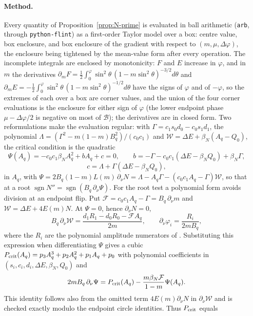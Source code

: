 \documentclass[11pt]{article}
\theoremstyle{remark}
\begin{document}
\paragraph{Method.}  Every quantity of Proposition~\ref{prop:N-prime} is
evaluated in ball arithmetic \cite{Johansson2017Arb,Tucker2011}
(\texttt{arb}, through \texttt{python-flint}) as a first-order Taylor
model over a box: centre value, box enclosure, and box enclosure of the
gradient with respect to $(m,\mu,\Delta\varphi)$, the enclosure being
tightened by the mean-value form after every operation.  The incomplete
integrals are enclosed by monotonicity: $F$ and $E$ increase in
$\varphi$, and in $m$ the derivatives
$\partial_mF=\tfrac12\int_0^\varphi\sin^2\theta\,(1-m\sin^2\theta)^{-3/2}d\theta$
and
$\partial_mE=-\tfrac12\int_0^\varphi\sin^2\theta\,(1-m\sin^2\theta)^{-1/2}d\theta$
have the signs of $\varphi$ and of $-\varphi$, so the extremes of each
over a box are corner values, and the union of the four corner
evaluations is the enclosure for either sign of $\varphi$ (the lower
endpoint phase $\mu-\Delta\varphi/2$ is negative on most of
$\mathcal B$); the derivatives are in closed form.  Two reformulations make the evaluation regular: with
$\Gamma=c_1s_0d_0-c_0s_1d_1$, the polynomial
$\Lambda=(\Gamma^2-m(1-m)B_q^2)/(c_0c_1)$ and $\mathcal W=\Delta E+\beta_N(A_q-Q_0)$,
the critical condition is the quadratic
\[
 \Psi(A_q)=-c_0c_1\beta_NA_q^2+bA_q+c=0,\qquad
 b=-\Gamma-c_0c_1(\Delta E-\beta_NQ_0)+\beta_N\Gamma,
\]
\[
 c=\Lambda+\Gamma(\Delta E-\beta_NQ_0),
\]
in $A_q$, with $\Psi=2B_q(1-m)L(m)\,\partial_\nu N=\Lambda-A_q\Gamma-(c_0c_1A_q-\Gamma)\mathcal W$,
so that at a root $\operatorname{sgn}N''=\operatorname{sgn}(B_q\,\partial_\nu\Psi)$.
For the root test a polynomial form avoids division at an endpoint flip.
Put $\mathcal F=c_0c_1A_q-\Gamma=B_q\,\partial_\nu m$ and
$\mathcal W=\Delta E+4E(m)N$.  At $\Psi=0$, hence $\partial_\nu N=0$,
\[
 B_q\,\partial_\nu\mathcal W
 =\frac{d_1R_1-d_0R_0-\mathcal F A_q}{2m},
 \qquad \partial_\nu\varphi_i=\frac{R_i}{2mB_q},
\]
where the $R_i$ are the polynomial amplitude numerators of
.  Substituting this expression when
differentiating $\Psi$ gives a cubic $P_{\rm crit}(A_q)=p_3A_q^3+p_2A_q^2+p_1A_q+p_0$ with polynomial
coefficients in $(s_i,c_i,d_i,\Delta E,\beta_N,Q_0)$ and
\[
 2mB_q\,\partial_\nu\Psi
 =P_{\rm crit}(A_q)-\frac{m\beta_N\mathcal F}{1-m}\Psi(A_q).
\]
This identity follows also from the omitted term
$4E(m)\partial_\nu N$ in $\partial_\nu\mathcal W$ and is checked exactly
modulo the endpoint circle identities.  Thus $P_{\rm crit}$ equals
\end{document}
